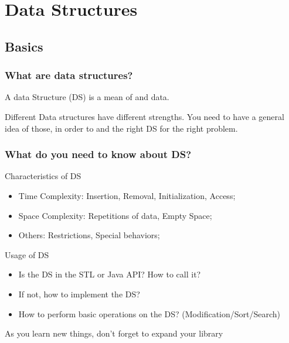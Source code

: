 \documentclass{beamer}
\begin{document}
\section{Data Structures}
\subsection{Basics}
\begin{frame}
  \frametitle{What are data structures?}

  A data Structure (DS) is a mean of  and
   data. 

  \vfill

  Different Data structures have different strengths. You need to have
  a general idea of those, in order to  and
   the right DS for the right problem.
\end{frame}

\begin{frame}
  \frametitle{What do you need to know about DS?}
  \begin{block}{Characteristics of DS}
    \begin{itemize}
    \item Time Complexity: Insertion, Removal, Initialization, Access;
    \item Space Complexity: Repetitions of data, Empty Space;
    \item Others: Restrictions, Special behaviors;
    \end{itemize}
  \end{block}

  \begin{exampleblock}{Usage of DS}
    \begin{itemize}
    \item Is the DS in the STL or Java API? How to call it?
    \item If not, how to implement the DS?
    \item How to perform basic operations on the DS? (Modification/Sort/Search)
    \end{itemize}
  \end{exampleblock}
  
  {\small As you learn new things, don't forget to expand your library}
\end{frame}
\end{document}
